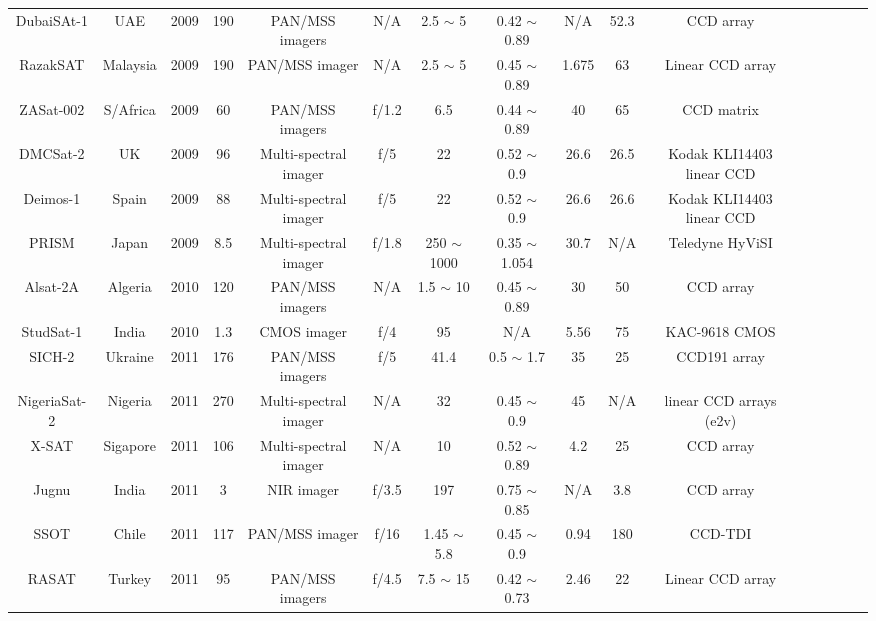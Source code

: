 \documentclass[final,5p,times,twocolumn]{elsarticle}
\begin{document}
\begin{table}
{\begin{tabular}{c c c c c c c c c c c c c c c c}
		    DubaiSAt-1 & UAE & 2009 & 190 & PAN/MSS imagers & N/A & 2.5 $\sim$ 5 & 0.42 $\sim$ 0.89 &  N/A &  52.3 & CCD array & \citep{al2009dubaisat}\\		
		    RazakSAT & Malaysia & 2009 & 190 & PAN/MSS imager & N/A & 2.5 $\sim$ 5 & 0.45 $\sim$ 0.89 & 1.675 & 63 & Linear CCD array & \citep{eoportal}\\	
		    ZASat-002 & S/Africa & 2009 & 60 & PAN/MSS imagers & f/1.2 & 6.5 & 0.44 $\sim$ 0.89 &  40 & 65 &  CCD matrix & \citep{burger2006south} \\
		    DMCSat-2 & UK & 2009 &  96 & Multi-spectral imager & f/5& 22 & 0.52 $\sim$ 0.9 & 26.6 & 26.5 & Kodak KLI14403 linear CCD  & \citep{eoportal}\\	
		    Deimos-1 & Spain & 2009 & 88 & Multi-spectral imager & f/5 & 22 & 0.52 $\sim$ 0.9 & 26.6 & 26.6 & Kodak KLI14403 linear CCD & \citep{eoportal}\\ 	    
		    PRISM & Japan & 2009 & 8.5 & Multi-spectral imager & f/1.8 & 250 $\sim$ 1000 & 0.35 $\sim$ 1.054 &  30.7 & N/A &   Teledyne HyViSI & \citep{mouroulis2014portable}\\		
		    Alsat-2A & Algeria & 2010 & 120 & PAN/MSS imagers & N/A & 1.5 $\sim$ 10 & 0.45 $\sim$ 0.89 &  30 & 50 &  CCD array & \cite{kameche2016flight}  \\	
		    StudSat-1 & India & 2010 & 1.3 & CMOS imager & f/4 & 95 & N/A &  5.56 & 75 & KAC-9618 CMOS & \citep{eoportal}\\		    	
		    SICH-2 & Ukraine & 2011 & 176 & PAN/MSS imagers & f/5 & 41.4 & 0.5 $\sim$ 1.7 & 35 & 25 &  CCD191 array & \citep{eoportal}\\
		    NigeriaSat-2 & Nigeria & 2011 & 270 & Multi-spectral imager & N/A & 32 & 0.45 $\sim$ 0.9 &  45 & N/A & linear CCD arrays (e2v) & \citep{eoportal}\\		
		    X-SAT & Sigapore & 2011 & 106 & Multi-spectral imager & N/A & 10 & 0.52 $\sim$ 0.89 &  4.2 & 25 &  CCD array & \citep{eoportal}\\		         
		    Jugnu  & India & 2011& 3 & NIR imager & f/3.5 & 197 & 0.75 $\sim$ 0.85 &  N/A & 3.8 &  CCD array & \citep{eoportal}\\		      
		    SSOT & Chile & 2011 & 117 & PAN/MSS imager & f/16 & 1.45 $\sim$ 5.8 & 0.45 $\sim$ 0.9 &  0.94 & 180 &CCD-TDI & \citep{eoportal}\\	
		    RASAT & Turkey & 2011 & 95 & PAN/MSS imagers & f/4.5 & 7.5 $\sim$ 15 & 0.42 $\sim$ 0.73 &  2.46 & 22 &  Linear CCD array &  \citep{teke2016satellite}\\	

\end{tabular}}
\end{table}
\end{document}
